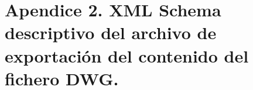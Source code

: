 \section{Apendice 2. XML Schema descriptivo del archivo de exportación del contenido del fichero DWG.}


